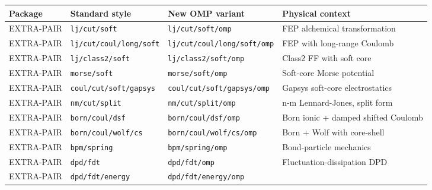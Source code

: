 \documentclass[
  11pt,
]{article}
\newcounter{none} %
\begin{document}
{\def\LTcaptype{none} %
\begin{longtable}[]{@{}
  >{\raggedright\arraybackslash}p{}
  >{\raggedright\arraybackslash}p{}
  >{\raggedright\arraybackslash}p{}
  >{\raggedright\arraybackslash}p{}@{}}
\toprule\noalign{}
\begin{minipage}[b]{\linewidth}\raggedright
Package
\end{minipage} & \begin{minipage}[b]{\linewidth}\raggedright
Standard style
\end{minipage} & \begin{minipage}[b]{\linewidth}\raggedright
New OMP variant
\end{minipage} & \begin{minipage}[b]{\linewidth}\raggedright
Physical context
\end{minipage} \\
\midrule\noalign{}
\endhead
\bottomrule\noalign{}
\endlastfoot
EXTRA-PAIR & \texttt{lj/cut/soft} & \texttt{lj/cut/soft/omp} & FEP
alchemical transformation \\
EXTRA-PAIR & \texttt{lj/cut/coul/long/soft} &
\texttt{lj/cut/coul/long/soft/omp} & FEP with long-range Coulomb \\
EXTRA-PAIR & \texttt{lj/class2/soft} & \texttt{lj/class2/soft/omp} &
Class2 FF with soft core \\
EXTRA-PAIR & \texttt{morse/soft} & \texttt{morse/soft/omp} & Soft-core
Morse potential \\
EXTRA-PAIR & \texttt{coul/cut/soft/gapsys} &
\texttt{coul/cut/soft/gapsys/omp} & Gapsys soft-core electrostatics \\
EXTRA-PAIR & \texttt{nm/cut/split} & \texttt{nm/cut/split/omp} & n-m
Lennard-Jones, split form \\
EXTRA-PAIR & \texttt{born/coul/dsf} & \texttt{born/coul/dsf/omp} & Born
ionic + damped shifted Coulomb \\
EXTRA-PAIR & \texttt{born/coul/wolf/cs} & \texttt{born/coul/wolf/cs/omp}
& Born + Wolf with core-shell \\
EXTRA-PAIR & \texttt{bpm/spring} & \texttt{bpm/spring/omp} &
Bond-particle mechanics \\
EXTRA-PAIR & \texttt{dpd/fdt} & \texttt{dpd/fdt/omp} &
Fluctuation-dissipation DPD \\
EXTRA-PAIR & \texttt{dpd/fdt/energy} & \texttt{dpd/fdt/energy/omp} &

\end{longtable}}
\end{document}
